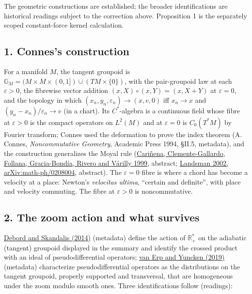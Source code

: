 \documentclass[11pt,a4paper]{article}
\begin{document}
The geometric constructions are established; the broader identifications
are historical readings subject to the correction above. Proposition 1
is the separately scoped constant-force kernel calculation.

\hypertarget{conness-construction}{%
\subsection{1. Connes's construction}\label{conness-construction}}

For a manifold \(M\), the tangent groupoid is
\(\mathbb G_M=(M\times M\times(0,1])\cup(TM\times\{0\})\), with the
pair-groupoid law at each \(\varepsilon>0\), the fibrewise vector
addition \((x,X)\circ(x,Y)=(x,X+Y)\) at \(\varepsilon=0\), and the
topology in which \((x_n,y_n,\varepsilon_n)\to(x,v,0)\) iff \(x_n\to x\)
and \((y_n-x_n)/\varepsilon_n\to v\) (in a chart). Its \(C^*\)-algebra
is a continuous field whose fibre at \(\varepsilon>0\) is the compact
operators on \(L^2(M)\) and at \(\varepsilon=0\) is \(C_0(T^*M)\) by
Fourier transform; Connes used the deformation to prove the index
theorem (A. Connes, \emph{Noncommutative Geometry}, Academic Press 1994,
§II.5, metadata), and the construction generalizes the Moyal rule
(\href{https://doi.org/10.1016/S0393-0440(98)00028-X}{Cariñena,
Clemente-Gallardo, Follana, Gracia-Bondía, Rivero and Várilly 1999},
abstract; \href{https://arxiv.org/abs/math-ph/0208004}{Landsman 2002,
arXiv:math-ph/0208004}, abstract). The \(\varepsilon=0\) fibre is where
a chord has become a velocity at a place: Newton's \emph{velocitas
ultima}, ``certain and definite'', with place and velocity commuting.
The fibre at \(\varepsilon>0\) is noncommutative.

\hypertarget{the-zoom-action-and-what-survives}{%
\subsection{2. The zoom action and what
survives}\label{the-zoom-action-and-what-survives}}

\href{https://doi.org/10.1016/j.aim.2014.02.012}{Debord and Skandalis
(2014)} (metadata) define the action of \(\mathbb R_+^*\) on the
adiabatic (tangent) groupoid displayed in the summary and identify the
crossed product with an ideal of pseudodifferential operators;
\href{https://doi.org/10.1515/crelle-2017-0035}{van Erp and Yuncken
(2019)} (metadata) characterize pseudodifferential operators as the
distributions on the tangent groupoid, properly supported and
transversal, that are homogeneous under the zoom modulo smooth ones.
Three identifications follow (readings):
\end{document}
